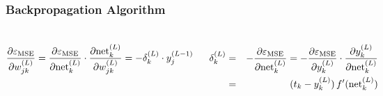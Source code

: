 \begin{frame}
  \frametitle{Backpropagation Algorithm \cont}


  \begin{columns}
      {\footnotesize
      \begin{displaymath}
        \frac{\partial \varepsilon_{\text{MSE}}}{\partial w_{jk}^{(L)}} =
        \frac{\partial \varepsilon_{\text{MSE}}}{\partial \text{net}_{k}^{(L)}} \cdot \frac{\partial \text{net}_{k}^{(L)}}{\partial w_{jk}^{(L)}} =
        - \delta_k^{(L)} \cdot y_j^{(L-1)}
      \end{displaymath}
      }
      \vspace*{.5cm}

      \hspace*{0.4cm}

      {\footnotesize
      \begin{eqnarray*}
        \delta_k^{(L)} 
        & = & - \frac{\partial \varepsilon_{\text{MSE}}}{\partial \text{net}_{k}^{(L)}}
          =   - \frac{\partial \varepsilon_{\text{MSE}}}{\partial y_{k}^{(L)}} \cdot \frac{\partial y_{k}^{(L)}}{\partial \text{net}_{k}^{(L)}} \\
        & = & (t_k - y_{k}^{(L)}) \, f'(\text{net}_{k}^{(L)})
      \end{eqnarray*}
      }
      \begin{center}
        \resizebox{\linewidth}{!}{
          
        }
      \end{center}
  \end{columns}
\end{frame}


